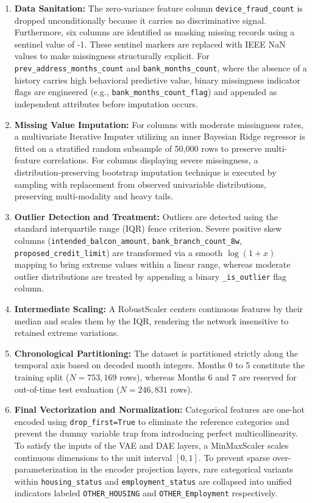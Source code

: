 \documentclass[11pt,a4paper]{report}
\begin{document}
\begin{enumerate}
    \item \textbf{Data Sanitation:} The zero-variance feature column \texttt{device\_fraud\_count} is dropped unconditionally because it carries no discriminative signal. Furthermore, six columns are identified as masking missing records using a sentinel value of -1. These sentinel markers are replaced with IEEE NaN values to make missingness structurally explicit. For \texttt{prev\_address\_months\_count} and \texttt{bank\_months\_count}, where the absence of a history carries high behavioral predictive value, binary missingness indicator flags are engineered (e.g., \texttt{bank\_months\_count\_flag}) and appended as independent attributes before imputation occurs.
    \item \textbf{Missing Value Imputation:} For columns with moderate missingness rates, a multivariate Iterative Imputer utilizing an inner Bayesian Ridge regressor is fitted on a stratified random subsample of 50,000 rows to preserve multi-feature correlations. For columns displaying severe missingness, a distribution-preserving bootstrap imputation technique is executed by sampling with replacement from observed univariable distributions, preserving multi-modality and heavy tails.
    \item \textbf{Outlier Detection and Treatment:} Outliers are detected using the standard interquartile range (IQR) fence criterion. Severe positive skew columns (\texttt{intended\_balcon\_amount}, \texttt{bank\_branch\_count\_8w}, \texttt{proposed\_credit\_limit}) are transformed via a smooth $\log(1+x)$ mapping to bring extreme values within a linear range, whereas moderate outlier distributions are treated by appending a binary \texttt{\_is\_outlier} flag column.
    \item \textbf{Intermediate Scaling:} A RobustScaler centers continuous features by their median and scales them by the IQR, rendering the network insensitive to retained extreme variations.
    \item \textbf{Chronological Partitioning:} The dataset is partitioned strictly along the temporal axis based on decoded month integers. Months 0 to 5 constitute the training split ($N = 753,169$ rows), whereas Months 6 and 7 are reserved for out-of-time test evaluation ($N = 246,831$ rows).
    \item \textbf{Final Vectorization and Normalization:} Categorical features are one-hot encoded using \texttt{drop\_first=True} to eliminate the reference categories and prevent the dummy variable trap from introducing perfect multicollinearity. To satisfy the inputs of the VAE and DAE layers, a MinMaxScaler scales continuous dimensions to the unit interval $[0, 1]$. To prevent sparse over-parameterization in the encoder projection layers, rare categorical variants within \texttt{housing\_status} and \texttt{employment\_status} are collapsed into unified indicators labeled \texttt{OTHER\_HOUSING} and \texttt{OTHER\_Employment} respectively.
\end{enumerate}
\end{document}
